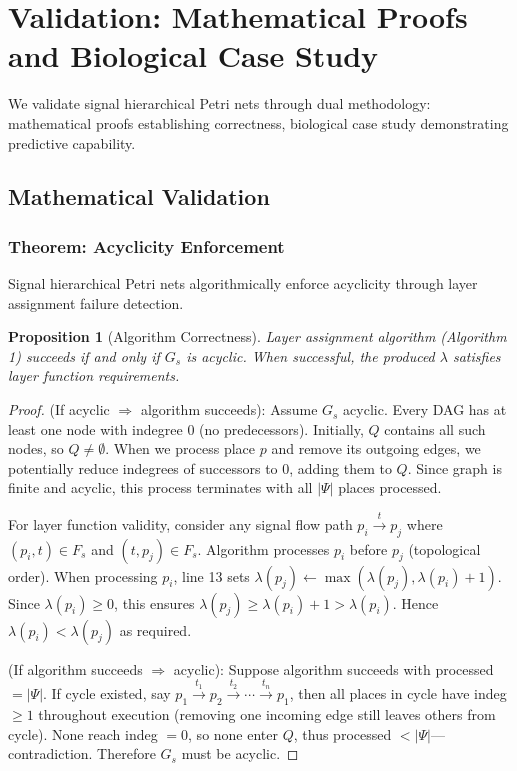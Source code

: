 \documentclass[10pt,letterpaper]{article}
\newtheorem{proposition}{Proposition}
\begin{document}
\section{Validation: Mathematical Proofs and Biological Case Study}\label{sec:validation}

We validate signal hierarchical Petri nets through dual methodology: mathematical proofs establishing correctness, biological case study demonstrating predictive capability.

\subsection{Mathematical Validation}

\subsubsection{Theorem: Acyclicity Enforcement}

Signal hierarchical Petri nets algorithmically enforce acyclicity through layer assignment failure detection.

\begin{proposition}[Algorithm Correctness]
Layer assignment algorithm (Algorithm 1) succeeds if and only if $G_s$ is acyclic. When successful, the produced $\lambda$ satisfies layer function requirements.
\end{proposition}

\begin{proof}
(If acyclic $\Rightarrow$ algorithm succeeds): Assume $G_s$ acyclic. Every DAG has at least one node with indegree 0 (no predecessors). Initially, $Q$ contains all such nodes, so $Q \neq \emptyset$. When we process place $p$ and remove its outgoing edges, we potentially reduce indegrees of successors to 0, adding them to $Q$. Since graph is finite and acyclic, this process terminates with all $|\Psi|$ places processed.

For layer function validity, consider any signal flow path $p_i \xrightarrow{t} p_j$ where $(p_i,t) \in F_s$ and $(t,p_j) \in F_s$. Algorithm processes $p_i$ before $p_j$ (topological order). When processing $p_i$, line 13 sets $\lambda(p_j) \leftarrow \max(\lambda(p_j), \lambda(p_i) + 1)$. Since $\lambda(p_i) \geq 0$, this ensures $\lambda(p_j) \geq \lambda(p_i) + 1 > \lambda(p_i)$. Hence $\lambda(p_i) < \lambda(p_j)$ as required.

(If algorithm succeeds $\Rightarrow$ acyclic): Suppose algorithm succeeds with processed $= |\Psi|$. If cycle existed, say $p_1 \xrightarrow{t_1} p_2 \xrightarrow{t_2} \cdots \xrightarrow{t_n} p_1$, then all places in cycle have indeg $\geq 1$ throughout execution (removing one incoming edge still leaves others from cycle). None reach indeg $= 0$, so none enter $Q$, thus processed $< |\Psi|$---contradiction. Therefore $G_s$ must be acyclic.
\end{proof}
\end{document}
